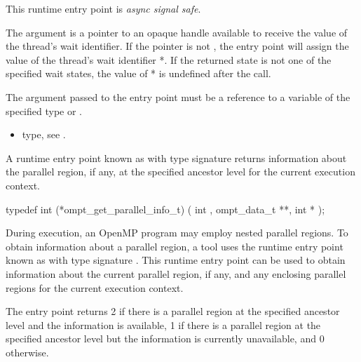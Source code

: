 This runtime entry point is \emph{async signal safe}.

\argdesc

The argument  is a pointer to an opaque handle
available to receive the value of the thread's wait identifier.  If
the  pointer is not , the entry point
will assign the value of the thread's wait identifier
*.  If the returned state is not one of the specified
wait states, the value of * is undefined after the call.

\constraints
The argument passed to the entry point must be a reference
to a variable of the specified type or .

\crossreferences
\begin{itemize}
\item {} type, see .
\end{itemize}


\label{sec:ompt_get_parallel_info_t}
\label{sec:ompt_get_parallel_info}

\summary

A runtime entry point known as 
with type signature 
returns information about
the parallel region, if any, at the specified ancestor level
for the current execution context.

\format
\begin{ccppspecific}
\begin{omptInquiry}
typedef int (*ompt_get_parallel_info_t) (
  int ,
  ompt_data_t **,
  int *
);
\end{omptInquiry}
\end{ccppspecific}

\descr
During execution, an OpenMP program may employ nested parallel
regions.
To obtain information about a parallel region,
a tool uses the runtime entry point known as
with type signature .
This runtime entry point
can be used to obtain information about the current parallel region,
if any, and any enclosing parallel regions
for the current execution context.

The entry point returns 2 if there is a parallel region at the
specified ancestor level and the information is available,
1 if there is a parallel region at the specified ancestor level
but the information is currently unavailable, and 0 otherwise.

